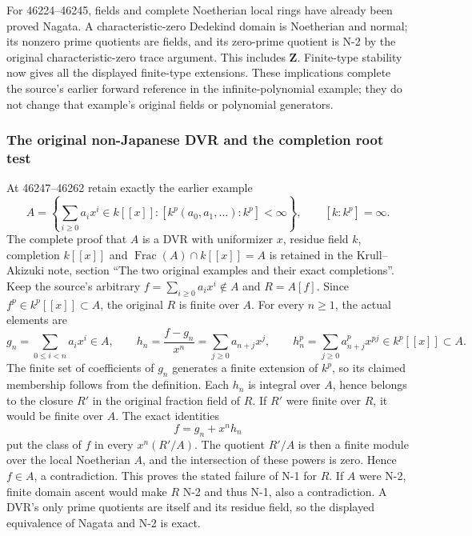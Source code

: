 For 46224--46245, fields and complete Noetherian local rings have already been proved Nagata. A characteristic-zero Dedekind domain is Noetherian and normal; its nonzero prime quotients are fields, and its zero-prime quotient is N-2 by the original characteristic-zero trace argument. This includes \(\mathbf Z\). Finite-type stability now gives all the displayed finite-type extensions. These implications complete the source's earlier forward reference in the infinite-polynomial example; they do not change that example's original fields or polynomial generators.

\subsubsection{The original non-Japanese DVR and the completion root test}\label{the-original-non-japanese-dvr-and-the-completion-root-test}

At 46247--46262 retain exactly the earlier example \[
 A=\left\{\sum_{i\geq0}a_i x^i\in k[[x]]:
 [k^p(a_0,a_1,\ldots):k^p]<\infty\right\},
 \qquad [k:k^p]=\infty.
\] The complete proof that \(A\) is a DVR with uniformizer \(x\), residue field \(k\), completion \(k[[x]]\) and \(\operatorname{Frac}(A)\cap k[[x]]=A\) is retained in the Krull--Akizuki note, section ``The two original examples and their exact completions''. Keep the source's arbitrary \(f=\sum_{i\geq0}a_i x^i\notin A\) and \(R=A[f]\). Since \(f^p\in k^p[[x]]\subset A\), the original \(R\) is finite over \(A\). For every \(n\geq1\), the actual elements are \[
 g_n=\sum_{0\leq i<n}a_i x^i\in A,
 \qquad h_n=\frac{f-g_n}{x^n}=\sum_{j\geq0}a_{n+j}x^j,
 \qquad h_n^p=\sum_{j\geq0}a_{n+j}^{p}x^{pj}\in k^p[[x]]\subset A.
\] The finite set of coefficients of \(g_n\) generates a finite extension of \(k^p\), so its claimed membership follows from the definition. Each \(h_n\) is integral over \(A\), hence belongs to the closure \(R'\) in the original fraction field of \(R\). If \(R'\) were finite over \(R\), it would be finite over \(A\). The exact identities \[
 f=g_n+x^n h_n
\] put the class of \(f\) in every \(x^n(R'/A)\). The quotient \(R'/A\) is then a finite module over the local Noetherian \(A\), and the intersection of these powers is zero. Hence \(f\in A\), a contradiction. This proves the stated failure of N-1 for \(R\). If \(A\) were N-2, finite domain ascent would make \(R\) N-2 and thus N-1, also a contradiction. A DVR's only prime quotients are itself and its residue field, so the displayed equivalence of Nagata and N-2 is exact.

